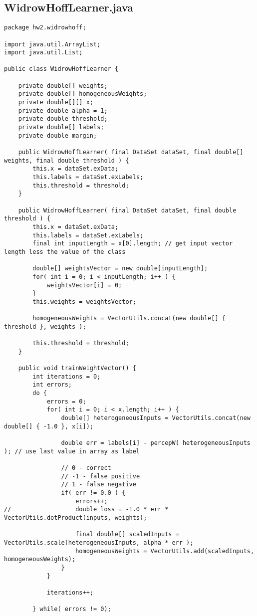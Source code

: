 \subsection{WidrowHoffLearner.java}
\begin{lstlisting}
package hw2.widrowhoff;

import java.util.ArrayList;
import java.util.List;

public class WidrowHoffLearner {

	private double[] weights;
	private double[] homogeneousWeights;
	private double[][] x;
	private double alpha = 1;
	private double threshold;
	private double[] labels;
	private double margin;
	
	public WidrowHoffLearner( final DataSet dataSet, final double[] weights, final double threshold ) {
		this.x = dataSet.exData;
		this.labels = dataSet.exLabels;
		this.threshold = threshold;
	}
	
	public WidrowHoffLearner( final DataSet dataSet, final double threshold ) {
		this.x = dataSet.exData;
		this.labels = dataSet.exLabels;
		final int inputLength = x[0].length; // get input vector length less the value of the class
		
		double[] weightsVector = new double[inputLength];
		for( int i = 0; i < inputLength; i++ ) {
			weightsVector[i] = 0;
		}
		this.weights = weightsVector;
		
		homogeneousWeights = VectorUtils.concat(new double[] { threshold }, weights );
		
		this.threshold = threshold;
	}
	
	public void trainWeightVector() {
		int iterations = 0;
		int errors;
		do {
			errors = 0;
			for( int i = 0; i < x.length; i++ ) {
				double[] heterogeneousInputs = VectorUtils.concat(new double[] { -1.0 }, x[i]);
				
				double err = labels[i] - percepW( heterogeneousInputs ); // use last value in array as label
				
				// 0 - correct
				// -1 - false positive
				// 1 - false negative
				if( err != 0.0 ) {
					errors++;
//					double loss = -1.0 * err * VectorUtils.dotProduct(inputs, weights);
					
					final double[] scaledInputs = VectorUtils.scale(heterogeneousInputs, alpha * err );
					homogeneousWeights = VectorUtils.add(scaledInputs, homogeneousWeights);
				}
			}
			
			iterations++;
			
		} while( errors != 0);
		

\end{lstlisting}
